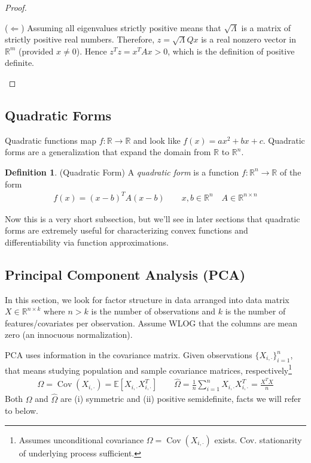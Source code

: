 \documentclass[12pt]{article}
\numberwithin{equation}{section} %
\theoremstyle{plain}
\theoremstyle{definition}
\newtheorem{defn}[thm]{Definition}
\theoremstyle{remark}
\newcommand{\R}{\mathbb{R}}
\newcommand{\Rn}{\mathbb{R}^n}
\newcommand{\Rm}{\mathbb{R}^m}
\newcommand{\Rnn}{\mathbb{R}^{n\times n}}
\newcommand{\E}{\mathbb{E}}
\newcommand{\Cov}{\operatorname{Cov}}
\begin{document}
\begin{proof}
\begin{enumerate}[label=(\roman*)]
    ($\Leftarrow$)
    Assuming all eigenvalues strictly positive means that
    $\sqrt{\Lambda}$ is a matrix of strictly positive real numbers.
    Therefore, $z=\sqrt{\Lambda}Qx$ is a real nonzero vector in $\Rm$
    (provided $x\neq 0$).
    Hence $z^Tz=x^TAx>0$, which is the definition of positive definite.
\end{enumerate}
\end{proof}


\clearpage
\subsection{Quadratic Forms}

Quadratic functions map $f:\R\rightarrow\R$ and look like $f(x)=ax^2 +
bx+c$. Quadratic forms are a generalization that expand the domain from
$\R$ to $\Rn$.

\begin{defn}{(Quadratic Form)}
A \emph{quadratic form} is a function $f:\Rn\rightarrow\R$ of the form
\begin{align*}
  f(x) = (x-b)^TA(x-b)
  \qquad x,b\in\Rn \quad A\in\Rnn
\end{align*}
\end{defn}

Now this is a very short subsection, but we'll see in later sections
that quadratic forms are extremely useful for characterizing convex
functions and differentiability via function approximations.


\clearpage
\subsection{Principal Component Analysis (PCA)}

In this section, we look for factor structure in data arranged into data
matrix $X\in\R^{n\times k}$ where $n>k$ is the number of observations
and $k$ is the number of features/covariates per observation.  Assume
WLOG that the columns are mean zero (an innocuous normalization).

PCA uses information in the covariance matrix.  Given observations
$\{X_{i,\cdot}\}_{i=1}^n$, that means studying population and sample
covariance matrices, respectively\footnote{%
  Assumes unconditional covariance $\Omega=\Cov(X_{i,\cdot})$ exists.
  Cov. stationarity of underlying process sufficient.
}
\begin{align*}
  \Omega = \Cov(X_{i,\cdot})
  = \E[X_{i,\cdot}X_{i,\cdot}^T]
  \qquad
  \hat{\Omega}
  = \frac{1}{n}\sum_{i=1}^n X_{i,\cdot}X_{i,\cdot}^T
  = \frac{X^T X}{n}
\end{align*}
Both $\Omega$ and $\hat{\Omega}$ are (i) symmetric and (ii) positive
semidefinite, facts we will refer to below.
\end{document}
